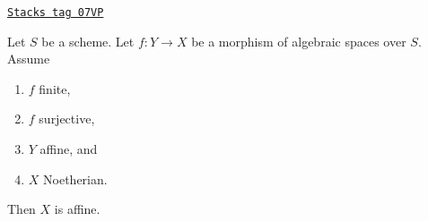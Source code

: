 \begin{lemma}
\label{spaces-cohomology-lemma-image-affine-finite-morphism-affine-Noetherian}
\href{https://stacks.math.columbia.edu/tag/07VP}{\texttt{Stacks tag 07VP}}

Let $S$ be a scheme. Let $f : Y \to X$ be a morphism of algebraic
spaces over $S$. Assume
\begin{enumerate}
\item $f$ finite,
\item $f$ surjective,
\item $Y$ affine, and
\item $X$ Noetherian.
\end{enumerate}
Then $X$ is affine.
\end{lemma}

